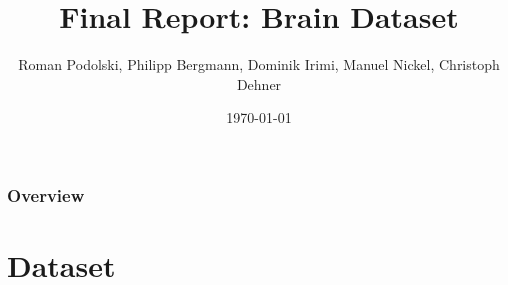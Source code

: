 \documentclass{beamer}
\title[Brain dataset]{Final Report: Brain Dataset} %
\author{Roman Podolski, Philipp Bergmann, Dominik Irimi, Manuel Nickel, Christoph Dehner} %
\institute[TUM] %
{
Technische Universit\"at M\"unchen \\ %
\medskip
\textit{roman.podolski@tum.de, philipp.bergmann@tum.de, dominik.irimi@tum.de, manuel.nickel@tum.de, dehner@in.tum.de} %
}
\date{\today} %
\begin{document}
\begin{frame}
\titlepage %
\end{frame}

\begin{frame}
\frametitle{Overview} %
\tableofcontents %
\end{frame}


\section{Dataset} %

\end{document}
